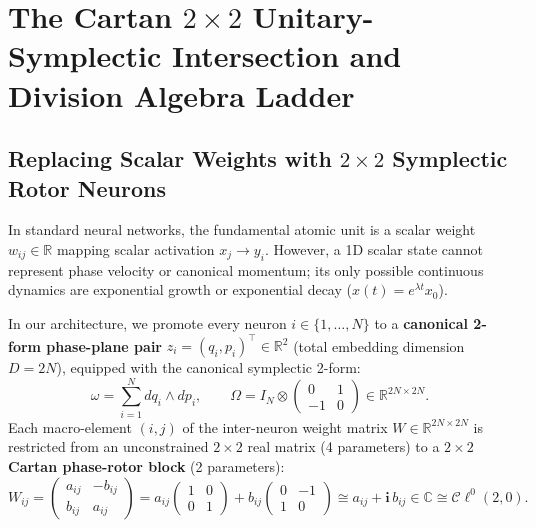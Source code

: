 \documentclass[11pt,a4paper]{article}
\begin{document}
\section{The Cartan $2\times 2$ Unitary-Symplectic Intersection and Division Algebra Ladder}
\label{sec:cartan_triple}

\subsection{Replacing Scalar Weights with $2\times 2$ Symplectic Rotor Neurons}
In standard neural networks, the fundamental atomic unit is a scalar weight $w_{ij} \in \mathbb{R}$ mapping scalar activation $x_j \to y_i$. However, a 1D scalar state cannot represent phase velocity or canonical momentum; its only possible continuous dynamics are exponential growth or exponential decay ($x(t) = e^{\lambda t}x_0$).

In our architecture, we promote every neuron $i \in \{1,\dots,N\}$ to a \textbf{canonical 2-form phase-plane pair} $z_i = (q_i, p_i)^\top \in \mathbb{R}^2$ (total embedding dimension $D = 2N$), equipped with the canonical symplectic 2-form:
\begin{equation}
    \omega = \sum_{i=1}^N dq_i \wedge dp_i, \qquad \Omega = I_N \otimes \begin{pmatrix} 0 & 1 \\ -1 & 0 \end{pmatrix} \in \mathbb{R}^{2N\times 2N}.
\end{equation}
Each macro-element $(i,j)$ of the inter-neuron weight matrix $W \in \mathbb{R}^{2N\times 2N}$ is restricted from an unconstrained $2\times 2$ real matrix (4 parameters) to a \textbf{$2\times 2$ Cartan phase-rotor block} (2 parameters):
\begin{equation}
    W_{ij} = \begin{pmatrix} a_{ij} & -b_{ij} \\ b_{ij} & a_{ij} \end{pmatrix} = a_{ij} \begin{pmatrix} 1 & 0 \\ 0 & 1 \end{pmatrix} + b_{ij} \begin{pmatrix} 0 & -1 \\ 1 & 0 \end{pmatrix} \cong a_{ij} + \mathbf{i}\, b_{ij} \in \mathbb{C} \cong \mathcal{C}\ell^0(2,0).
    \label{eq:cartan_2x2_element}
\end{equation}
\end{document}
